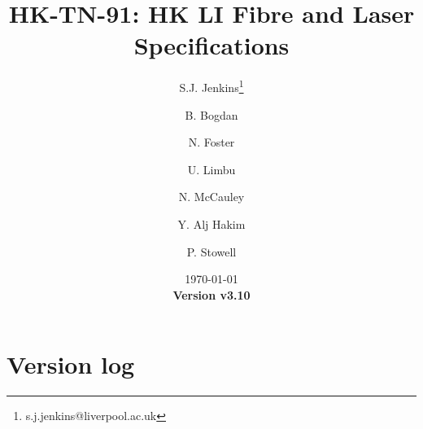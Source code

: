 \documentclass[a4paper,11pt]{article}
\begin{document}
\title{\huge{HK-TN-91: HK LI Fibre and Laser Specifications}}
\author[1]{S.J. Jenkins\footnote{s.j.jenkins@liverpool.ac.uk}}
\author[1]{B. Bogdan}
\author[1]{N. Foster}
\author[1]{U. Limbu}
\author[1]{N. McCauley}
\author[2]{Y. Alj Hakim}
\author[2]{P. Stowell}
\date{\today\\
{\bf Version v3.10}}

\maketitle

\tableofcontents

\newpage

\section{Version log}
\end{document}

